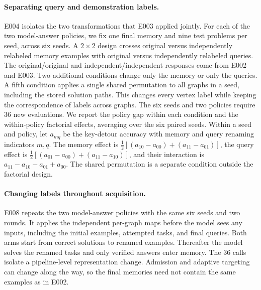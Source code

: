 \documentclass[11pt]{article}
\begin{document}
\paragraph{Separating query and demonstration labels.}
E004 isolates the two transformations that E003 applied jointly.
For each of the two model-answer policies, we fix one final memory
and nine test problems per seed, across six seeds. A $2\times2$ design
crosses original versus independently relabeled memory examples with
original versus independently relabeled queries. The original/original
and independent/independent responses come from E002 and E003.
Two additional conditions change only the memory or only the queries.
A fifth condition applies a single shared permutation to all graphs in
a seed, including the stored solution paths. This changes every vertex
label while keeping the correspondence of labels across graphs.
The six seeds and two policies require 36 new evaluations. We report
the policy gap within each condition and the within-policy factorial
effects, averaging over the six paired seeds. Within a seed and
policy, let $a_{mq}$ be the key-detour accuracy with memory and
query renaming indicators $m,q$. The memory effect is
$\tfrac12[(a_{10}-a_{00})+(a_{11}-a_{01})]$, the query effect is
$\tfrac12[(a_{01}-a_{00})+(a_{11}-a_{10})]$, and their interaction
is $a_{11}-a_{10}-a_{01}+a_{00}$. The shared permutation is a
separate condition outside the factorial design.

\paragraph{Changing labels throughout acquisition.}
E008 repeats the two model-answer policies with the same six seeds
and two rounds. It applies the independent per-graph maps before the
model sees any inputs, including the initial examples, attempted
tasks, and final queries. Both arms start from correct solutions
to renamed examples. Thereafter the model solves the renamed tasks
and only verified answers enter memory. The 36 calls isolate a
pipeline-level representation change. Admission and adaptive
targeting can change along the way, so the final memories need
not contain the same examples as in E002.
\end{document}
